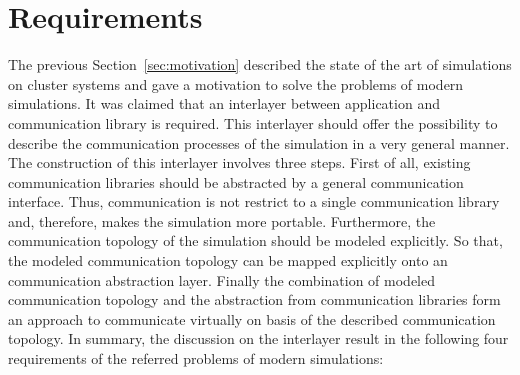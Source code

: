 



\section{Requirements}
\label{sec:requirements}

The previous Section~\ref{sec:motivation} described the state of the
art of simulations on cluster systems and gave a motivation to solve
the problems of modern simulations.
It was
claimed that an interlayer between application and communication
library is required.  This interlayer should offer the possibility to
describe the communication processes of the simulation in a very
general manner.  The construction of this interlayer involves three
steps.  First of all, existing communication libraries should be
abstracted by a general communication interface. Thus, communication
is not restrict to a single communication library and, therefore,
makes the simulation more portable.  Furthermore, the communication
topology of the simulation should be modeled explicitly.  So that, the
modeled communication topology can be mapped explicitly onto an
communication abstraction layer.  Finally the combination of modeled
communication topology and the abstraction from communication
libraries form an approach to communicate virtually on basis of the
described communication topology.  In summary, the discussion on the
interlayer result in the following four requirements of the referred
problems of modern simulations:

